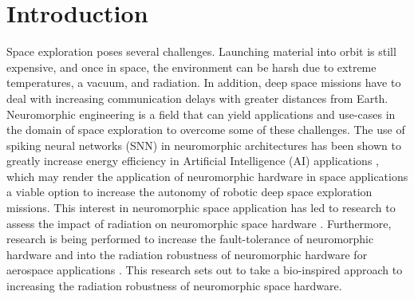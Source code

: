 \section{Introduction}\label{sec:introduction}
Space exploration poses several challenges. Launching material into orbit is still expensive, and once in space, the environment can be harsh due to extreme temperatures, a vacuum, and radiation. In addition, deep space missions have to deal with increasing communication delays with greater distances from Earth. Neuromorphic engineering is a field that can yield applications and use-cases in the domain of space exploration to overcome some of these challenges. The use of spiking neural networks (SNN) in neuromorphic architectures has been shown to greatly increase energy efficiency in Artificial Intelligence (AI) applications\cite{davies_loihi_2018}\cite{todo}
, which may render the application of neuromorphic hardware in space applications a viable option to increase the autonomy of robotic deep space exploration missions. 
This interest in neuromorphic space application has led to research to assess the impact of radiation on neuromorphic space hardware \cite{cantley_impact_2021,roffe_neutron-induced_2021}. Furthermore, research is being performed to increase the fault-tolerance of neuromorphic hardware \cite{tran_design_2011} and into the radiation robustness of neuromorphic hardware for aerospace applications \cite{vaz_cmos_2020}. This research sets out to take a bio-inspired approach to increasing the radiation robustness of neuromorphic space hardware.

